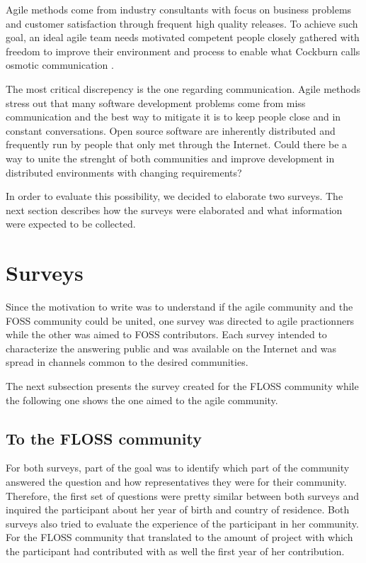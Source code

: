 \documentclass[lnbip]{svmultln}
\begin{document}
Agile methods come from industry consultants with focus on business
problems and customer satisfaction through frequent high quality
releases. To achieve such goal, an ideal agile team needs motivated
competent people closely gathered with freedom to improve their
environment and process to enable what Cockburn calls osmotic
communication \cite{Cockburn2004}.

The most critical discrepency is the one regarding
communication. Agile methods stress out that many software development
problems come from miss communication and the best way to mitigate it
is to keep people close and in constant conversations. Open source
software are inherently distributed and frequently run by people that
only met through the Internet. Could there be a way to unite the
strenght of both communities and improve development in distributed
environments with changing requirements?

In order to evaluate this possibility, we decided to elaborate two
surveys. The next section describes how the surveys were elaborated
and what information were expected to be collected.

\section{Surveys}
\label{sec:surveys}

Since the motivation to write was to understand if the agile community
and the FOSS community could be united, one survey was directed to
agile practionners while the other was aimed to FOSS contributors.
Each survey intended to characterize the answering public and was
available on the Internet and was spread in channels common to the
desired communities.

The next subsection presents the survey created for the FLOSS
community while the following one shows the one aimed to the agile
community.

\subsection{To the FLOSS community}
\label{subsec:floss-survey}

For both surveys, part of the goal was to identify which part of the
community answered the question and how representatives they were for
their community. Therefore, the first set of questions were pretty
similar between both surveys and inquired the participant about her
year of birth and country of residence. Both surveys also tried to
evaluate the experience of the participant in her community. For the
FLOSS community that translated to the amount of project with which
the participant had contributed with as well the first year of her
contribution.
\end{document}
